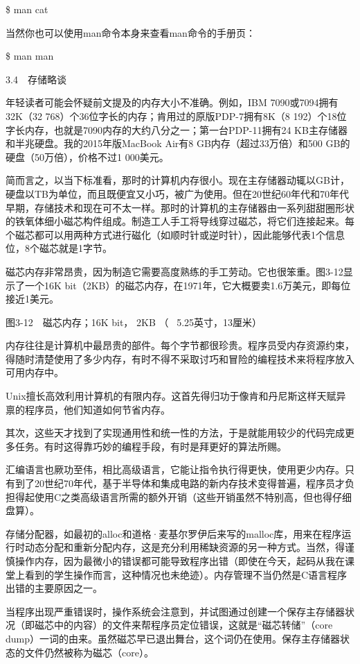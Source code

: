 \documentclass[a4paper,12pt,UTF8,twoside]{ctexbook}
\begin{document}
{\$ man cat

当然你也可以使用man命令本身来查看man命令的手册页：

\$ man man





3.4　存储略谈


年轻读者可能会怀疑前文提及的内存大小不准确。例如，IBM 7090或7094拥有32K（32 768）个36位字长的内存；肯用过的原版PDP-7拥有8K（8 192）个18位字长内存，也就是7090内存的大约八分之一；第一台PDP-11拥有24 KB主存储器和半兆硬盘。我的2015年版MacBook Air有8 GB内存（超过33万倍）和500 GB的硬盘（50万倍），价格不过1 000美元。

简而言之，以当下标准看，那时的计算机内存很小。现在主存储器动辄以GB计，硬盘以TB为单位，而且既便宜又小巧，被广为使用。但在20世纪60年代和70年代早期，存储技术和现在可不太一样。那时的计算机的主存储器由一系列甜甜圈形状的铁氧体细小磁芯构件组成。制造工人手工将导线穿过磁芯，将它们连接起来。每个磁芯都可以用两种方式进行磁化（如顺时针或逆时针），因此能够代表1个信息位，8个磁芯就是1字节。

磁芯内存非常昂贵，因为制造它需要高度熟练的手工劳动。它也很笨重。图3-12显示了一个16K bit（2KB）的磁芯内存，在1971年，它大概要卖1.6万美元，即每位接近1美元。



图3-12　磁芯内存；16K bit， 2KB （ ~5.25英寸，13厘米）

内存往往是计算机中最昂贵的部件。每个字节都很珍贵。程序员受内存资源约束，得随时清楚使用了多少内存，有时不得不采取讨巧和冒险的编程技术来将程序放入可用内存中。

Unix擅长高效利用计算机的有限内存。这首先得归功于像肯和丹尼斯这样天赋异禀的程序员，他们知道如何节省内存。

其次，这些天才找到了实现通用性和统一性的方法，于是就能用较少的代码完成更多任务。有时这得靠巧妙的编程手段，有时是拜更好的算法所赐。

汇编语言也厥功至伟，相比高级语言，它能让指令执行得更快，使用更少内存。只有到了20世纪70年代，基于半导体和集成电路的新内存技术变得普遍，程序员才负担得起使用C之类高级语言所需的额外开销（这些开销虽然不特别高，但也得仔细盘算）。

存储分配器，如最初的alloc和道格·麦基尔罗伊后来写的malloc库，用来在程序运行时动态分配和重新分配内存，这是充分利用稀缺资源的另一种方式。当然，得谨慎操作内存，因为最微小的错误都可能导致程序出错（即使在今天，起码从我在课堂上看到的学生操作而言，这种情况也未绝迹）。内存管理不当仍然是C语言程序出错的主要原因之一。

当程序出现严重错误时，操作系统会注意到，并试图通过创建一个保存主存储器状况（即磁芯中的内容）的文件来帮程序员定位错误，这就是“磁芯转储”（core dump）一词的由来。虽然磁芯早已退出舞台，这个词仍在使用。保存主存储器状态的文件仍然被称为磁芯（core）。





}
\end{document}
